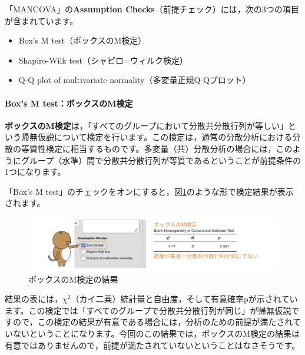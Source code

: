 \documentclass[
  12pt,
  a5jpaper,
  lualatex, ja=standard]{bxjsbook}
\providecommand{\tightlist}{%
  \setlength{\itemsep}{0pt}\setlength{\parskip}{0pt}}
\renewcommand{\emph}[1]{\textbf{\color{emph} #1}}
\newenvironment{jmvsettings}{%
	\begin{center}%
	\begin{tcolorbox}[%
		title=設定項目,
		colframe=gmoji,
		colbacktitle=gmoji,
		colback=gmoji!2!white,
		breakable,
		width=.9\textwidth,
		]\small\addtolength{\leftmargini}{-3\labelsep}%
	}%
	{\end{tcolorbox}\end{center}}
\begin{document}
「MANCOVA」の\textbf{Assumption Checks}（前提チェック）には，次の3つの項目が含まれています。

\begin{jmvsettings}

\begin{itemize}
\tightlist
\item
  Box's M test（ボックスのM検定）
\item
  Shapiro-Wilk test（シャピロ=ウィルク検定）
\item
  Q-Q plot of multivariate normality（多変量正規Q-Qプロット）
\end{itemize}

\end{jmvsettings}

\hypertarget{boxs-m-testux30dcux30c3ux30afux30b9ux306emux691cux5b9a}{%
\paragraph*{Box's M test：ボックスのM検定}\label{boxs-m-testux30dcux30c3ux30afux30b9ux306emux691cux5b9a}}

\emph{ボックスのM検定}は，「すべてのグループにおいて分散共分散行列が等しい」という帰無仮説について検定を行います。この検定は，通常の分散分析における分散の等質性検定に相当するものです。多変量（共）分散分析の場合には，このようにグループ（水準）間で分散共分散行列が等質であるということが前提条件の1つになります。

「Box's M test」のチェックをオンにすると，図\ref{fig:ANOVA-mancova-box}のような形で検定結果が表示されます。

\begin{figure}[!ht]

{\centering \includegraphics[width=1\linewidth]{images/ANOVA/mancova-box} 

}

\caption{ボックスのM検定の結果}\label{fig:ANOVA-mancova-box}
\end{figure}

結果の表には，\(\chi^2\)（カイ二乗）統計量と自由度，そして有意確率pが示されています。この検定では「すべてのグループで分散共分散行列が同じ」が帰無仮説ですので，この検定の結果が有意である場合には，分析のための前提が満たされていないということになります。今回のこの結果では，ボックスのM検定の結果は有意ではありませんので，前提が満たされていないということはなさそうです。
\end{document}
